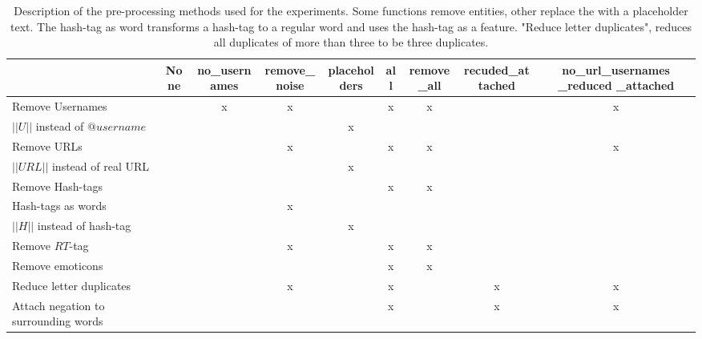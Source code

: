 \begin{table}
\caption[Description of used pre-processing methods]{Description of the pre-processing methods used for the experiments. Some functions remove entities, other replace the with a placeholder text. The hash-tag as word transforms a hash-tag to a regular word and uses the hash-tag as a feature. "Reduce letter duplicates", reduces all duplicates of more than three to be three duplicates.}
\label{tab:preproc_desc}

\begin{tabular}{|p{4cm}|c|c|c|c|c|c|c|c|}
\hline
 & None & no\_usernames & remove\_noise & placeholders & all & remove\_all & recuded\_attached &\parbox[c]{3cm}{\raggedright no\_url\_usernames \_reduced \_attached} \\ \hline

Remove Usernames                     & & x & x &   & x & x & & x \\ \hline
     
$||U||$ instead of $@username$       & &   &   & x &   &   & & \\ \hline
     
Remove URLs                          & &   & x &   & x & x & & x \\ \hline
     
$||URL||$ instead of real URL        & &   &   & x &   &   & & \\ \hline
     
Remove Hash-tags                     & &   &   &   & x & x & & \\ \hline
     
Hash-tags as words                   & &   & x &   &   &   & & \\ \hline
     
$||H||$ instead of hash-tag          & &   &   & x &   &   & & \\ \hline
     
Remove $RT$-tag                      & &   & x &   & x & x & & \\ \hline
     
Remove emoticons                     & &   &   &   & x & x & & \\ \hline
     
Reduce letter duplicates             & &   & x &   & x &   & x & x \\ \hline

Attach negation to surrounding words & &   &   &   & x &   & x & x \\ \hline

\end{tabular}

\end{table}


